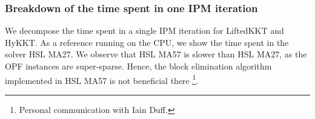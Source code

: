 \begin{table}[!ht]
  \centering
  \label{tab:sckkt:performance}
  \caption{Performance of the equality-relaxation
    strategy as we decrease the IPM tolerance $\varepsilon_{tol}$.
    The table displays the wall time on the CPU (using CHOLMOD-\ldlt)
    and on the GPU (using cuDSS-\ldlt).
  }
\end{table}

\subsubsection{Breakdown of the time spent in one IPM iteration}
We decompose the time spent in a single
IPM iteration for LiftedKKT and HyKKT.
As a reference running on the CPU, we show the time spent in the solver HSL MA27.
We observe that HSL MA57 is slower
than HSL MA27, as the OPF instances are super-sparse.
Hence, the block elimination algorithm implemented in HSL MA57 is not beneficial there
\footnote{Personal communication with Iain Duff.}.

